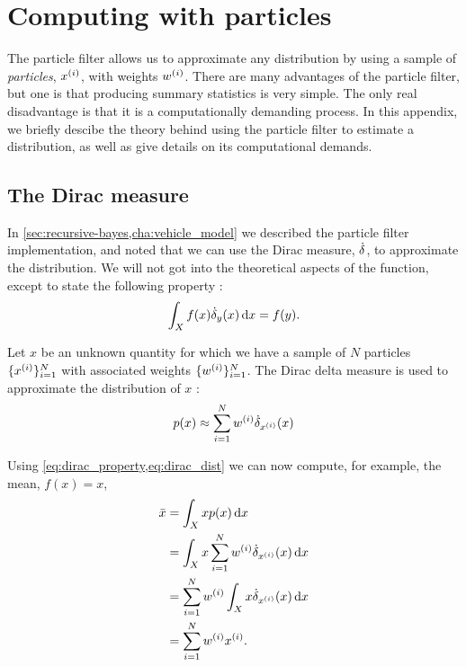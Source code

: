 \chapter{Computing with particles}
\label{app:computing-with-particles}

The particle filter allows us to approximate any distribution by using a sample of \emph{particles}, $x^{(i)}$, with weights $w^{(i)}$. There are many advantages of the particle filter, but one is that producing summary statistics is very simple. The only real disadvantage is that it is a computationally demanding process. In this appendix, we briefly descibe the theory behind using the particle filter to estimate a distribution, as well as give details on its computational demands.


\section{The Dirac measure}
\label{app:dirac-delta-measure}

In \cref{sec:recursive-bayes,cha:vehicle_model} we described the particle filter implementation, and noted that we can use the Dirac measure, $\dot\delta$, to approximate the distribution. We will not got into the theoretical aspects of the function, except to state the following property \citep{cn}:
\begin{equation}
\label{eq:dirac_property}
\int_X f(x) \dot\delta_y(x)\,\mathrm{d}x = f(y).
\end{equation}

Let $x$ be an unknown quantity for which we have a sample of $N$ particles $\{x^{(i)}\}_{i=1}^N$ with associated weights $\{w^{(i)}\}_{i=1}^N$. The Dirac delta measure is used to approximate the distribution of $x$ \citep{cn}:
\begin{equation}
\label{eq:dirac_dist}
p(x) \approx \sum_{i=1}^N w^{(i)} \dot\delta_{x^{(i)}}(x)
\end{equation}


Using \cref{eq:dirac_property,eq:dirac_dist} we can now compute, for example, the mean, $f(x) = x$,
\begin{equation}
\label{eq:dirac_mean}
\begin{split}
\bar x &= \int_X x p(x) \,\mathrm{d}x \\
&= \int_X x \sum_{i=1}^N w^{(i)} \dot\delta_{x^{(i)}}(x) \,\mathrm{d}x \\
&= \sum_{i=1}^N w^{(i)} \int_X x \dot\delta_{x^{(i)}}(x) \,\mathrm{d}x \\
&= \sum_{i=1}^N w^{(i)} x^{(i)}.
\end{split}
\end{equation}




